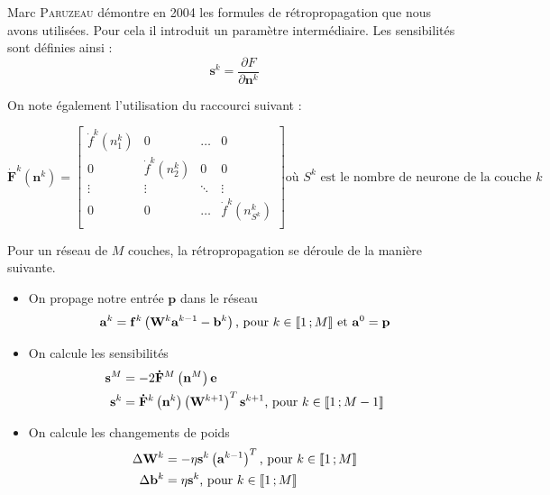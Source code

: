 Marc \textsc{Paruzeau} démontre en 2004 les formules de rétropropagation que nous avons utilisées. Pour cela il introduit un paramètre %
intermédiaire. Les sensibilités sont définies ainsi :
\begin{equation}
 \mathbf{s}^k = \frac{\partial F}{\partial \mathbf{n}^k}
\end{equation}

On note également l'utilisation du raccourci suivant : 

\begin{equation}
  \displaystyle
 \mathbf{\dot F}^k\left(\mathbf{n}^k\right) =
 \begin{bmatrix}
  \dot f ^k\left(n^k_1\right) & 0 & \ldots & 0\\
  0 & \dot f^k\left(n^k_2\right) & 0 & 0\\
  \vdots & \vdots & \ddots & \vdots \\
  0 & 0 & \ldots & \dot f^k\left(n^k_{S^k}\right)\\
 \end{bmatrix}
 \text{où $S^k$ est le nombre de neurone de la couche $k$}
\end{equation}

Pour un réseau de $M$ couches, la rétropropagation se déroule de la manière suivante.
\begin{itemize}
 \item On propage notre entrée $\mathbf{p}$ dans le réseau
 \begin{equation}
   \mathbf{a}^k = \mathbf{f}^k\left(\mathbf{W}^k\mathbf{a}^{k-1} - \mathbf{b}^k\right) \text{, pour $k \in \mathopen{\llbracket}1\,;M\mathclose{\rrbracket}$ et $\mathbf{a}^0 = \mathbf{p}$}
 \end{equation}
 
 \item On calcule les sensibilités 
 \begin{align}
  \mathbf{s}^M &= -2\mathbf{\dot F}^M\left(\mathbf{n}^M\right)\mathbf{e} \\
  \mathbf{s}^k &= \mathbf{\dot F}^k\left(\mathbf{n}^k\right)\left(\mathbf{W}^{k+1}\right)^T \mathbf{s}^{k+1} \text{, pour $k \in \mathopen{\llbracket}1\,;M-1\mathclose{\rrbracket}$}
 \end{align}
 
 \item On calcule les changements de poids
 \begin{align}
  \Delta \mathbf{W}^k &= - \eta \mathbf{s}^k\left(\mathbf{a}^{k-1}\right)^T \text{, pour $k \in \mathopen{\llbracket}1\,;M\mathclose{\rrbracket}$} \\
  \Delta \mathbf{b}^k &= \eta \mathbf{s}^k \text{, pour $k \in \mathopen{\llbracket}1\,;M\mathclose{\rrbracket}$}
 \end{align}

\end{itemize}


